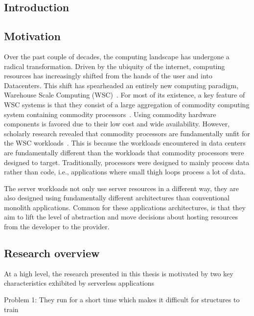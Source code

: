 \documentclass[../main.tex]{subfiles}
\begin{document}
\ifx\chapincluded\undefined
  \begin{refsection}
 \fi


\chapter{Introduction}

\section{Motivation}
Over the past couple of decades, the computing landscape has undergone a radical transformation. Driven by the ubiquity of the internet, computing resources has increasingly shifted from the hands of the user and into Datacenters. This shift has spearheaded an entirely new computing paradigm, Warehouse Scale Computing (WSC)~\cite{barroso18_datac_as_comput}. For most of its existence, a key feature of WSC systems is that they consist of a large aggregation of commodity computing system containing commodity processors~\cite{barroso03_web_searc_planet}. Using commodity hardware components is favored due to their low cost and wide availability. However, scholarly research revealed that commodity processors are fundamentally unfit for the WSC workloads~\cite{ ferdman12_clear_cloud,kanev15_profil}. This is because the workloads encountered in data centers are fundamentally different than the workloads that commodity processors were designed to target. Traditionally, processors were designed to mainly process data rather than code,  i.e., applications where small thigh loops process a lot of data.

The server workloads not only use server resources in a different way, they are also designed using fundamentally different architectures than conventional monolith applications. Common for these applications architectures, is that they aim to lift the level of abstraction and move decisions about hosting resources from the developer to the provider.

\section{Research overview}

At a high level, the research presented in this thesis is motivated by two key characteristics exhibited by serverless applications

Problem 1: They run for a short time which makes it difficult for structures to train


\end{refsection}
\end{document}
